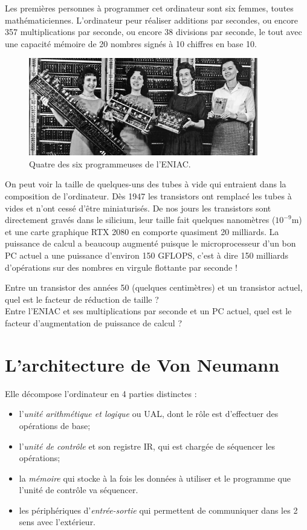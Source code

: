 Les premières personnes à programmer cet ordinateur sont six femmes, toutes mathématiciennes. L'ordinateur peur réaliser  additions par secondes, ou encore 357 multiplications par seconde, ou encore 38 divisions par seconde, le tout avec une capacité mémoire de 20 nombres signés à 10 chiffres en base 10.
\begin{figure}[H]
    \begin{center}
        \includegraphics[width=10cm]{img/eniac.jpg}
    \end{center}
    \caption*{Quatre des six programmeuses de l'ENIAC.}
\end{figure}

On peut voir la taille de quelques-uns des  tubes à vide qui entraient dans la composition de l'ordinateur. Dès 1947 les transistors ont remplacé les tubes à vides et n'ont cessé d'être miniaturisés. De nos jours les transistors sont directement gravés dans le silicium, leur taille fait quelques nanomètres ($10^{-9}$m) et une carte graphique RTX 2080 en comporte quasiment 20 milliards. La puissance de calcul a beaucoup augmenté puisque le microprocesseur d'un bon PC actuel a une puissance d'environ 150 GFLOPS,  c'est à dire 150 milliards d'opérations sur des nombres en virgule flottante par seconde !

\begin{exercice}[]
    Entre un transistor des années 50 (quelques centimètres) et un transistor actuel, quel est le facteur de réduction de taille ?\\
    Entre l'ENIAC et ses multiplications par seconde et un PC actuel, quel est le facteur d'augmentation de puissance de calcul ?
\end{exercice}

\section{L'architecture de Von Neumann}



Elle décompose l'ordinateur en 4 parties distinctes :
\begin{itemize}
    \item 	l'\textit{unité arithmétique et logique} ou UAL, dont le rôle est d'effectuer des opérations de base;
    \item 	l'\textit{unité de contrôle} et son registre IR, qui est chargée de séquencer les opérations;
    \item 	la \textit{mémoire} qui stocke à la fois les données à utiliser et le programme que l'unité de contrôle va séquencer.
    \item 	les périphériques d'\textit{entrée-sortie} qui permettent de communiquer dans les 2 sens avec l'extérieur.
\end{itemize}

